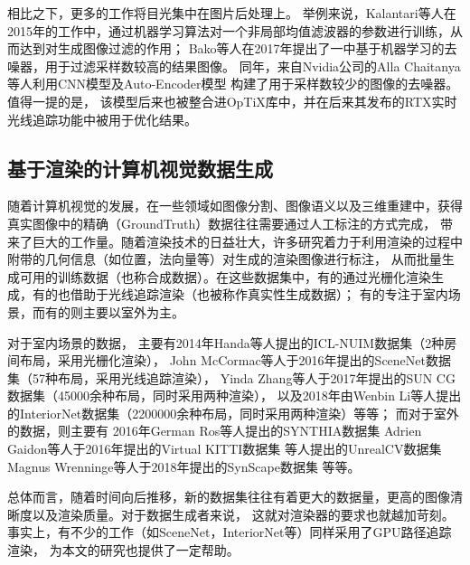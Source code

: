 相比之下，更多的工作将目光集中在图片后处理上。
举例来说，Kalantari等人在2015年的工作中\cite{MachingLearning1}，通过机器学习算法对一个非局部均值滤波器的参数进行训练，从而达到对生成图像过滤的作用；
Bako等人在2017年提出了一中基于机器学习的去噪器\cite{MachingLearningDenoiser}，用于过滤采样数较高的结果图像。
同年，来自Nvidia公司的Alla Chaitanya等人利用CNN模型及Auto-Encoder模型
构建了用于采样数较少的图像的去噪器\cite{NvidiaDenoiser}。值得一提的是，
该模型后来也被整合进OpTiX库中，并在后来其发布的RTX实时光线追踪功能中被用于优化结果\cite{RTXDenoiser}。

\subsection{基于渲染的计算机视觉数据生成}

随着计算机视觉的发展，在一些领域如图像分割、图像语义以及三维重建中，获得真实图像中的精确（GroundTruth）数据往往需要通过人工标注的方式完成，
带来了巨大的工作量。随着渲染技术的日益壮大，许多研究着力于利用渲染的过程中附带的几何信息（如位置，法向量等）对生成的渲染图像进行标注，
从而批量生成可用的训练数据（也称合成数据）。在这些数据集中，有的通过光栅化渲染生成，有的也借助于光线追踪渲染（也被称作真实性生成数据）；
有的专注于室内场景，而有的则主要以室外为主。

对于室内场景的数据，
主要有2014年Handa等人提出的ICL-NUIM数据集\cite{ICLNUIM}（2种房间布局，采用光栅化渲染），
John McCormac等人于2016年提出的SceneNet数据集\cite{SceneNet}（57种布局，采用光线追踪渲染），
Yinda Zhang等人于2017年提出的SUN CG数据集\cite{SUNCG}（45000余种布局，同时采用两种渲染），
以及2018年由Wenbin Li等人提出的InteriorNet数据集\cite{InteriorNet}（2200000余种布局，同时采用两种渲染）等等；
而对于室外的数据，则主要有
2016年German Ros等人提出的SYNTHIA数据集%
Adrien Gaidon等人于2016年提出的Virtual KITTI数据集%
等人提出的UnrealCV数据集%
Magnus Wrenninge等人于2018年提出的SynScape数据集%
等等。

总体而言，随着时间向后推移，新的数据集往往有着更大的数据量，更高的图像清晰度以及渲染质量。对于数据生成者来说，
这就对渲染器的要求也就越加苛刻。事实上，有不少的工作（如SceneNet，InteriorNet等）同样采用了GPU路径追踪渲染，
为本文的研究也提供了一定帮助。